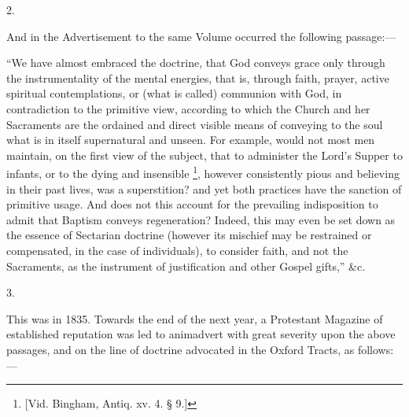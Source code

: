 2.

And in the Advertisement to the same Volume
occurred the following passage:—

``We have almost embraced the doctrine, that God
conveys grace only through the instrumentality of the mental energies,
that is, through faith, prayer, active spiritual contemplations, or
(what is called) communion with God, in contradiction to the primitive
view, according to which the Church and her Sacraments are the
ordained and direct visible means of conveying to the soul what is in
itself supernatural and unseen. For example, would not most men
maintain, on the first view of the subject, that to administer the
Lord's Supper to infants, or to the dying and insensible \footnote{[Vid. Bingham, Antiq. xv. 4. § 9.]}, however consistently pious and believing in their past lives,
was a superstition? and yet both practices have the sanction of
primitive usage. And does not this account for the prevailing
indisposition to admit that Baptism conveys regeneration?
Indeed, this may even be set down as the essence of Sectarian doctrine
(however its mischief may be restrained or compensated, in the case of
individuals), to consider faith, and not the Sacraments, as the
instrument of justification and other Gospel gifts,'' \&c.

3.

This was in 1835. Towards the end of the next
year, a Protestant Magazine of established reputation was led to
animadvert with great severity upon the above passages, and on the
line of doctrine advocated in the Oxford Tracts, as follows:—

